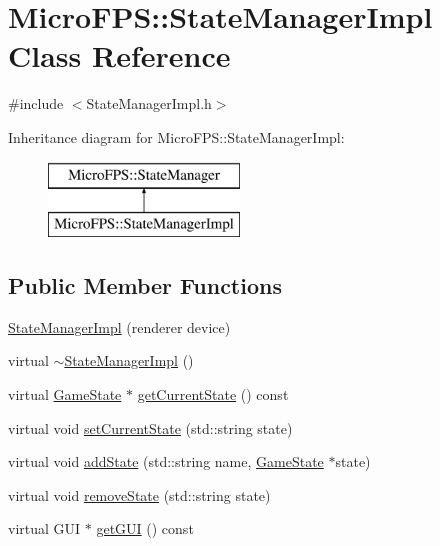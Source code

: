 \hypertarget{class_micro_f_p_s_1_1_state_manager_impl}{
\section{MicroFPS::StateManagerImpl Class Reference}
\label{d9/dc7/class_micro_f_p_s_1_1_state_manager_impl}
}


{\ttfamily \#include $<$StateManagerImpl.h$>$}

Inheritance diagram for MicroFPS::StateManagerImpl:\begin{figure}[H]
\begin{center}
\leavevmode
\includegraphics[height=2.000000cm]{d9/dc7/class_micro_f_p_s_1_1_state_manager_impl}
\end{center}
\end{figure}
\subsection*{Public Member Functions}
\begin{DoxyCompactItemize}
\item 
\hyperlink{class_micro_f_p_s_1_1_state_manager_impl_a5b0fd02ecf88778548542bf58f4e75bc}{StateManagerImpl} (renderer device)
\item 
virtual \hyperlink{class_micro_f_p_s_1_1_state_manager_impl_a6f244e71038028b079f301ad98a23266}{$\sim$StateManagerImpl} ()
\item 
virtual \hyperlink{class_micro_f_p_s_1_1_game_state}{GameState} $\ast$ \hyperlink{class_micro_f_p_s_1_1_state_manager_impl_aed21558f8d76cd3dce1a9fc5f76ea3c8}{getCurrentState} () const 
\item 
virtual void \hyperlink{class_micro_f_p_s_1_1_state_manager_impl_a36be818e3d8b561ef9372a1e043c05ed}{setCurrentState} (std::string state)
\item 
virtual void \hyperlink{class_micro_f_p_s_1_1_state_manager_impl_a8fffe04cfd95c1f84989a99b34e29ba2}{addState} (std::string name, \hyperlink{class_micro_f_p_s_1_1_game_state}{GameState} $\ast$state)
\item 
virtual void \hyperlink{class_micro_f_p_s_1_1_state_manager_impl_aefaa0295e49d20310bd2e95212aaa091}{removeState} (std::string state)
\item 
virtual GUI $\ast$ \hyperlink{class_micro_f_p_s_1_1_state_manager_impl_aeb4fcc00613a7c42376e6afb76b14b54}{getGUI} () const 
\end{DoxyCompactItemize}


